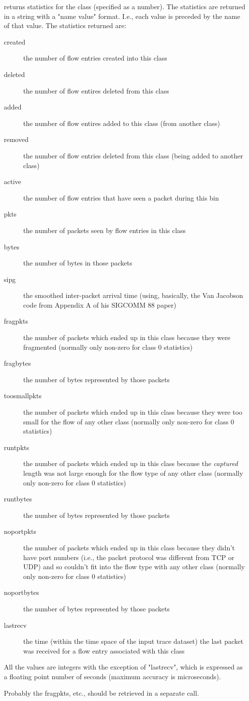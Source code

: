 \documentclass{article}
\begin{document}
\begin{description}
 returns statistics for the class 
(specified as a number).  The statistics are returned in a string with
a "name value" format.  I.e., each value is preceded by the name of
that value.  The statistics returned are:
\begin{description}
\item[created] the number of flow entries created into this class
\item[deleted] the number of flow entires deleted from this class
\item[added] the number of flow entires added to this class (from
another class)
\item[removed] the number of flow entries deleted from this class
(being added to another class)
\item[active] the number of flow entries that have seen a packet during
this bin
\item[pkts] the number of packets seen by flow entries in this class
\item[bytes] the number of bytes in those packets
\item[sipg] the smoothed inter-packet arrival time (using, basically,
the Van Jacobson code from Appendix A of his SIGCOMM 88 paper)
\item[fragpkts] the number of packets which ended up in this class
because they were fragmented (normally only non-zero for class 0 statistics)
\item[fragbytes] the number of bytes represented by those packets
\item[toosmallpkts] the number of packets which ended up in this class
because they were too small for the flow of any other class
(normally only non-zero for class 0 statistics)
\item[runtpkts] the number of packets which ended up in this class
because the \emph{captured} length was not large enough for the flow
type of any other class (normally only non-zero for class 0 statistics)
\item[runtbytes] the number of bytes represented by those packets
\item[noportpkts] the number of packets which ended up in this class
because they didn't have port numbers (i.e., the packet protocol was
different from TCP or UDP) and so couldn't fit into the flow type with
any other class (normally only non-zero for class 0 statistics)
\item[noportbytes] the number of bytes represented by those packets
\item[lastrecv] the time (within the time space of the input trace
dataset) the last packet was received for a flow entry associated with
this class
\end{description}

All the values are integers with the exception of "lastrecv", which is
expressed as a floating point number of seconds (maximum accuracy is
microseconds).

\BUGS

Probably the fragpkts, etc., should be retrieved in a separate call.

\end{description}
\end{document}
